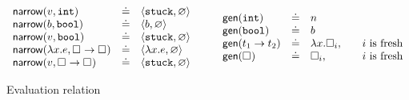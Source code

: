 \begin{figure*}
\begin{gather*}
\begin{array}{lcl}
\mathsf{narrow}(v, \mathtt{int})    & \doteq & \langle \mathtt{stuck}, \varnothing \rangle \\
\mathsf{narrow}(b, \mathtt{bool})   & \doteq & \langle b, \varnothing \rangle \\
\mathsf{narrow}(v, \mathtt{bool})   & \doteq & \langle \mathtt{stuck}, \varnothing \rangle \\
\mathsf{narrow}(\lambda x. e, {\square_{}} \rightarrow \square_{}) & \doteq & \langle \lambda x. e, \varnothing \rangle \\
\mathsf{narrow}(v, {\square_{}} \rightarrow \square_{}) & \doteq & \langle \mathtt{stuck}, \varnothing \rangle \\
\end{array}
\qquad
\begin{array}{lcll}
\mathsf{gen}(\mathtt{int})   & \doteq & n & \\
\mathsf{gen}(\mathtt{bool})  & \doteq & b & \\
\mathsf{gen}({t_1} \rightarrow t_2) & \doteq & \lambda x. \square_{i}, & \quad \text{$i$ is fresh} \\
\mathsf{gen}(\square_{}) & \doteq & \square_{i}, & \quad \text{$i$ is fresh} \\
\end{array}
\end{gather*}
\caption{Evaluation relation}
\label{fig:operational}
\end{figure*}

